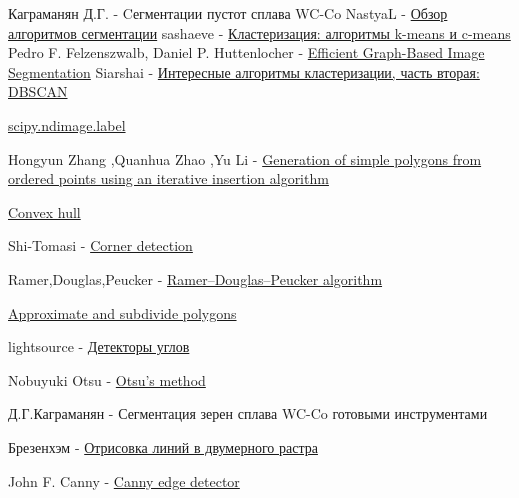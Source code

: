 \documentclass[a4paper, 14pt]{article}
\begin{document}
\newpage
\begin{thebibliography}{}
	
	
	  Каграманян Д.Г. -  Cегментации пустот сплава WC-Co
			  NastyaL  -  \href{https://habr.com/ru/company/intel/blog/266347/}{Обзор алгоритмов сегментации}
	 sashaeve - 
	\href{https://habr.com/ru/post/67078/}{Кластеризация: алгоритмы k-means и c-means}
	  Pedro F. Felzenszwalb, Daniel P. Huttenlocher  -  
	\href{https://people.cs.uchicago.edu/~pff/papers/seg-ijcv.pdf}{Efficient Graph-Based Image Segmentation}
	 Siarshai
	- \href{https://habr.com/ru/post/322034/}{Интересные алгоритмы кластеризации, часть вторая: DBSCAN}
	
		   \href{https://docs.scipy.org/doc/scipy/reference/generated/scipy.ndimage.label.html}{scipy.ndimage.label}
	
	  Hongyun Zhang ,Quanhua Zhao  ,Yu Li   -  \href{https://journals.plos.org/plosone/article?id=10.1371/journal.pone.0230342}{Generation of simple polygons from ordered points using an iterative insertion algorithm}
	
	    \href{https://en.wikipedia.org/wiki/Convex_hull}{Convex hull}
	
	  Shi-Tomasi   -  \href{https://en.wikipedia.org/wiki/Corner_detection}{Corner detection}
	
	 Ramer,Douglas,Peucker  - \href{https://habr.com/ru/post/448618/}{Ramer–Douglas–Peucker algorithm}
	
	  \href{https://scikit-image.org/docs/dev/auto_examples/edges/plot_polygon.html#sphx-glr-download-auto-examples-edges-plot-polygon-py} {Approximate and subdivide polygons}
	
	 lightsource
	-  \href{	https://habr.com/ru/post/244541/} {Детекторы углов}
	
	  Nobuyuki Otsu - \href{https://en.wikipedia.org/wiki/Otsu%27s_method} {Otsu's method}
	
	
	 Д.Г.Каграманян -  Сегментация зерен сплава WC-Co готовыми инструментами
	
	   Брезенхэм   -  \href{https://en.wikipedia.org/wiki/Bresenham%27s_line_algorithm}{Отрисовка линий в двумерного растра}
		
	    John F. Canny    -  \href{https://en.wikipedia.org/wiki/Canny_edge_detector}{Canny edge detector}
	

\end{thebibliography}
\end{document}
